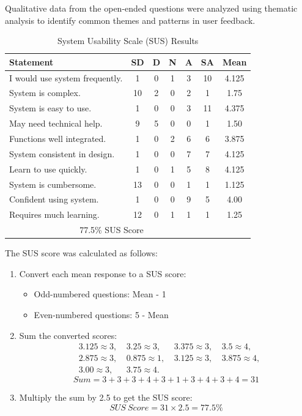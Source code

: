 \documentclass[conference]{IEEEtran}
\begin{document}
Qualitative data from the open-ended questions were analyzed using thematic analysis to identify common themes and patterns in user feedback. 
\begin{table}[ht]
    \centering
    \caption{System Usability Scale (SUS) Results}
    \begin{tabular}{l|ccccc|c}
    \hline
    \textbf{Statement} & \textbf{SD} & \textbf{D} & \textbf{N} & \textbf{A} & \textbf{SA} & \textbf{Mean} \\ \hline
    I would use system frequently. & 1 & 0 & 1 & 3 & 10 & 4.125 \\
    System is complex. & 10 & 2 & 0 & 2 & 1 & 1.75 \\
    System is easy to use. & 1 & 0 & 0 & 3 & 11 & 4.375 \\
    May need technical help. & 9 & 5 & 0 & 0 & 1 & 1.50 \\
    Functions well integrated. & 1 & 0 & 2 & 6 & 6 & 3.875 \\
    System consistent in design. & 1 & 0 & 0 & 7 & 7 & 4.125 \\
    Learn to use quickly. & 1 & 0 & 1 & 5 & 8 & 4.125 \\
    System is cumbersome. & 13 & 0 & 0 & 1 & 1 & 1.125 \\
    Confident using system. & 1 & 0 & 0 & 9 & 5 & 4.00 \\
    Requires much learning. & 12 & 0 & 1 & 1 & 1 & 1.25 \\ \hline
    \multicolumn{6}{c|}{77.5\% SUS Score} & \\ \hline
    \end{tabular}
    \label{tab:sus_results}
    \end{table}

    The SUS score was calculated as follows:
    \begin{enumerate}
        \item Convert each mean response to a SUS score:
        \begin{itemize}
            \item Odd-numbered questions: Mean - 1
            \item Even-numbered questions: 5 - Mean
        \end{itemize}
        \item Sum the converted scores:
        \begin{align}
            &3.125 \approx 3,& \ 3.25 \approx 3,& \ 3.375 \approx 3,& \ 3.5 \approx 4, \nonumber \\
            &2.875 \approx 3,& \ 0.875 \approx 1,& \ 3.125 \approx 3,& \ 3.875 \approx 4, \nonumber \\
            &3.00 \approx 3,& \ 3.75 \approx 4. \nonumber
        \end{align}
        \begin{equation}
            Sum = 3 + 3 + 3 + 4 + 3 + 1 + 3 + 4 + 3 + 4 = 31
        \end{equation}
        \item Multiply the sum by 2.5 to get the SUS score:
        \begin{equation}
            SUS\ Score = 31 \times 2.5 = 77.5\%
        \end{equation}
    \end{enumerate}
\end{document}
